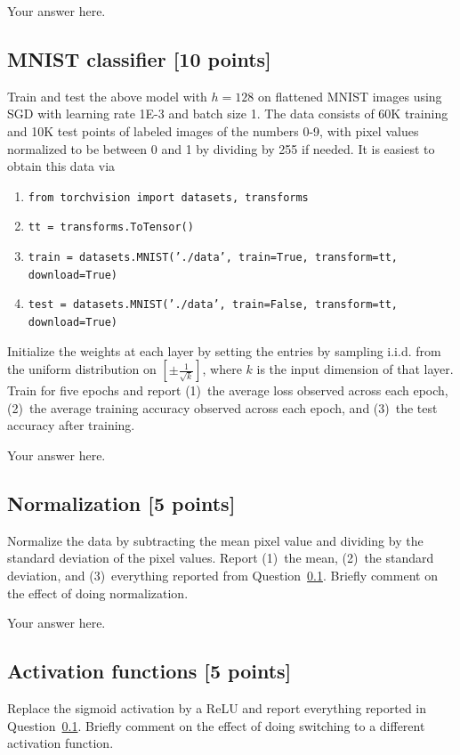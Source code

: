 \documentclass[a4paper]{article}
\theoremstyle{definition}
\begin{document}
{\color{blue} Your answer here.}

\subsection{MNIST classifier [10 points]}\label{sec:mnist}

Train and test the above model with $h=128$ on flattened MNIST images using SGD with learning rate 1E-3 and batch size 1.
The data consists of 60K training and 10K test points of labeled images of the numbers 0-9, with pixel values normalized to be between 0 and 1 by dividing by 255 if needed.
It is easiest to obtain this data via 
\begin{enumerate}
	\item {\tt from torchvision import datasets, transforms}
	\item {\tt tt = transforms.ToTensor()}
	\item {\tt train = datasets.MNIST('./data', train=True, transform=tt, download=True)}
	\item {\tt test = datasets.MNIST('./data', train=False, transform=tt, download=True)}
\end{enumerate}
Initialize the weights at each layer by setting the entries by sampling i.i.d. from the uniform distribution on $[\pm\tfrac1{\sqrt k}]$, where $k$ is the input dimension of that layer.
Train for five epochs and report (1)~the average loss observed across each epoch, (2)~the average training accuracy observed across each epoch, and (3)~the test accuracy after training.

{\color{blue} Your answer here.}

\subsection{Normalization [5 points]}

Normalize the data by subtracting the mean pixel value and dividing by the standard deviation of the pixel values.
Report (1)~the mean, (2)~the standard deviation, and (3)~everything reported from Question~\ref{sec:mnist}.
Briefly comment on the effect of doing normalization.

{\color{blue} Your answer here.}

\subsection{Activation functions [5 points]}\label{sec:activation}

Replace the sigmoid activation by a ReLU and report everything reported in Question~\ref{sec:mnist}.
Briefly comment on the effect of doing switching to a different activation function.
\end{document}
